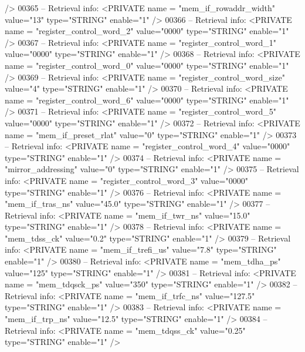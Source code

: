 \begin{DoxyCode}
{{       />}
00365 \textcolor{keyword}{-- Retrieval info:      <PRIVATE name = "mem\_if\_rowaddr\_width" value="13"  type="STRING"  enable="1" />}
00366 \textcolor{keyword}{-- Retrieval info:      <PRIVATE name = "register\_control\_word\_2" value="0000"  type="STRING"  enable="1"
       />}
00367 \textcolor{keyword}{-- Retrieval info:      <PRIVATE name = "register\_control\_word\_1" value="0000"  type="STRING"  enable="1"
       />}
00368 \textcolor{keyword}{-- Retrieval info:      <PRIVATE name = "register\_control\_word\_0" value="0000"  type="STRING"  enable="1"
       />}
00369 \textcolor{keyword}{-- Retrieval info:      <PRIVATE name = "register\_control\_word\_size" value="4"  type="STRING"  enable="1"
       />}
00370 \textcolor{keyword}{-- Retrieval info:      <PRIVATE name = "register\_control\_word\_6" value="0000"  type="STRING"  enable="1"
       />}
00371 \textcolor{keyword}{-- Retrieval info:      <PRIVATE name = "register\_control\_word\_5" value="0000"  type="STRING"  enable="1"
       />}
00372 \textcolor{keyword}{-- Retrieval info:      <PRIVATE name = "mem\_if\_preset\_rlat" value="0"  type="STRING"  enable="1" />}
00373 \textcolor{keyword}{-- Retrieval info:      <PRIVATE name = "register\_control\_word\_4" value="0000"  type="STRING"  enable="1"
       />}
00374 \textcolor{keyword}{-- Retrieval info:      <PRIVATE name = "mirror\_addressing" value="0"  type="STRING"  enable="1" />}
00375 \textcolor{keyword}{-- Retrieval info:      <PRIVATE name = "register\_control\_word\_3" value="0000"  type="STRING"  enable="1"
       />}
00376 \textcolor{keyword}{-- Retrieval info:      <PRIVATE name = "mem\_if\_tras\_ns" value="45.0"  type="STRING"  enable="1" />}
00377 \textcolor{keyword}{-- Retrieval info:      <PRIVATE name = "mem\_if\_twr\_ns" value="15.0"  type="STRING"  enable="1" />}
00378 \textcolor{keyword}{-- Retrieval info:      <PRIVATE name = "mem\_tdss\_ck" value="0.2"  type="STRING"  enable="1" />}
00379 \textcolor{keyword}{-- Retrieval info:      <PRIVATE name = "mem\_if\_trefi\_us" value="7.8"  type="STRING"  enable="1" />}
00380 \textcolor{keyword}{-- Retrieval info:      <PRIVATE name = "mem\_tdha\_ps" value="125"  type="STRING"  enable="1" />}
00381 \textcolor{keyword}{-- Retrieval info:      <PRIVATE name = "mem\_tdqsck\_ps" value="350"  type="STRING"  enable="1" />}
00382 \textcolor{keyword}{-- Retrieval info:      <PRIVATE name = "mem\_if\_trfc\_ns" value="127.5"  type="STRING"  enable="1" />}
00383 \textcolor{keyword}{-- Retrieval info:      <PRIVATE name = "mem\_if\_trp\_ns" value="12.5"  type="STRING"  enable="1" />}
00384 \textcolor{keyword}{-- Retrieval info:      <PRIVATE name = "mem\_tdqss\_ck" value="0.25"  type="STRING"  enable="1" />}
}
\end{DoxyCode}
